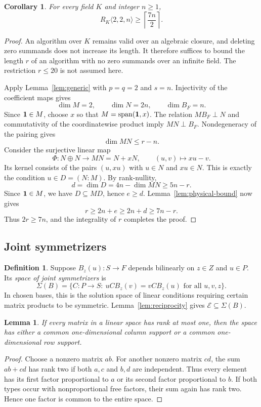 \documentclass[11pt,a4paper]{article}
\numberwithin{equation}{section}
\theoremstyle{plain}
\newtheorem{lemma}[theorem]{Lemma}
\newtheorem{cor}[theorem]{Corollary}
\theoremstyle{definition}
\newtheorem{definition}[theorem]{Definition}
\newcommand{\E}{\mathcal E}\newcommand{\Sig}{\Sigma}
\newcommand{\leqs}{\leqslant}\newcommand{\geqs}{\geqslant}
\begin{document}
\begin{cor}\label{cor:two-two-n}
For every field $K$ and integer $n\geqs1$,
\[
 R_K\langle2,2,n\rangle\geqs\left\lceil\frac{7n}{2}\right\rceil.
\]
\end{cor}
\begin{proof}
An algorithm over $K$ remains valid over an algebraic closure, and
deleting zero summands does not increase its length. It therefore
suffices to bound the length $r$ of an algorithm with no zero summands
over an infinite field. The restriction $r\leqs20$ is not assumed here.

Apply Lemma~\ref{lem:generic} with $p=q=2$ and $s=n$.
Injectivity of the coefficient maps gives
\[
 \dim M=2,\qquad \dim N=2n,\qquad \dim B_F=n.
\]
Since $\mathbf1\in M$, choose $x$ so that $M=\operatorname{span}(\mathbf1,x)$.
The relation $MB_F\perp N$ and commutativity of the coordinatewise
product imply $MN\perp B_F$. Nondegeneracy of the pairing gives
\[
 \dim MN\leqs r-n.
\]
Consider the surjective linear map
\[
 \Phi:N\oplus N\longrightarrow MN=N+xN,\qquad
 (u,v)\longmapsto xu-v.
\]
Its kernel consists of the pairs $(u,xu)$ with $u\in N$ and $xu\in N$.
This is exactly the condition $u\in D=(N:M)$. By rank-nullity,
\[
 d=\dim D=4n-\dim MN\geqs5n-r.
\]
Since $\mathbf1\in M$, we have $D\subseteq MD$, hence $e\geqs d$.
Lemma~\ref{lem:physical-bound} now gives
\[
 r\geqs2n+e\geqs2n+d\geqs7n-r.
\]
Thus $2r\geqs7n$, and the integrality of $r$ completes the proof.
\end{proof}

\subsection{Joint symmetrizers}

\begin{definition}
Suppose $B_z(u):S\to F$ depends bilinearly on $z\in Z$ and $u\in P$.
Its \emph{space of joint symmetrizers} is
\[
 \Sig(B)=\{C:P\to S:\ uCB_z(v)=vCB_z(u)
                          \text{ for all }u,v,z\}.
\]
In chosen bases, this is the solution space of linear conditions
requiring certain matrix products to be symmetric.
Lemma~\ref{lem:reciprocity} gives $\E\subseteq\Sig(B)$.
\end{definition}

\begin{lemma}\label{lem:rank-one-space}
If every matrix in a linear space has rank at most one, then the space
has either a common one-dimensional column support or a common
one-dimensional row support.
\end{lemma}
\begin{proof}
Choose a nonzero matrix $ab$. For another nonzero matrix $cd$, the sum
$ab+cd$ has rank two if both $a,c$ and $b,d$ are independent.
Thus every element has its first factor proportional to $a$ or its
second factor proportional to $b$. If both types occur with
nonproportional free factors, their sum again has rank two.
Hence one factor is common to the entire space.
\end{proof}
\end{document}
